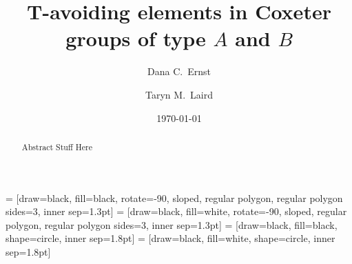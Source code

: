 \documentclass[11pt]{amsart}
\date{\today}
\theoremstyle{definition}
\numberwithin{equation}{section}
\renewcommand{\(}{\left(}
\renewcommand{\)}{\right)}
\begin{document}
 = [draw=black, fill=black, rotate=-90, sloped, regular polygon, regular polygon sides=3, inner sep=1.3pt]
 = [draw=black, fill=white, rotate=-90, sloped, regular polygon, regular polygon sides=3, inner sep=1.3pt]
 = [draw=black, fill=black, shape=circle, inner sep=1.8pt]
 = [draw=black, fill=white, shape=circle, inner sep=1.8pt]

\title[T-avoiding elements in Coxeter groups of type $A$ and $B$]{T-avoiding elements in Coxeter groups of type $A$ and $B$}

\author[D.C.~Ernst]{Dana C.~Ernst}
\address{Department of Mathematics and Statistics, Northern Arizona University, Flagstaff, AZ 86011}

\author[T.M.~Laird]{Taryn M.~Laird}
\address{Department of Mathematics and Statistics, Northern Arizona University, Flagstaff, AZ 86011}



\begin{abstract}
Abstract Stuff Here
\end{abstract}

\maketitle

\end{document}
